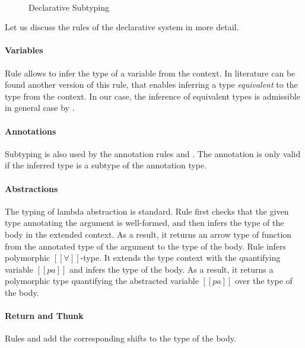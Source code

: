 \begin{figure}[h]

  \begin{multicols}{2}
  \ottdefnDTNInf{}
  \columnbreak\\
  \ottdefnDTPInf{}
  \ottdefnDTSpinInf{}
  \end{multicols}
  \hfill

  \caption{Declarative Subtyping}
  \label{fig:declarative-inference}
\end{figure}

Let us discuss the rules of the declarative system in more detail.

\paragraph{Variables}
  Rule  allows to infer
  the type of a variable from the context. 
  In literature can be found another version of this rule,
  that enables inferring a type \emph{equivalent}
  to the type from the context. 
  In our case, the inference of equivalent types
  is admissible in general case by .

\paragraph{Annotations}
  Subtyping is also used by the annotation rules 
  and . The annotation is only valid if the
  inferred type is a subtype of the annotation type.


\paragraph{Abstractions}
  The typing of lambda abstraction is standard. 
  Rule  first checks
  that the given type annotating the argument is well-formed,
  and then infers the type of the body in the extended context.
  As a result, it returns an arrow type of function from the
  annotated type of the argument to the type of the body.
  Rule  infers polymorphic $[[∀]]$-type. 
  It extends the type context with the quantifying variable $[[pa]]$ and 
  infers the type of the body. As a result, it returns a polymorphic type
  quantifying the abstracted variable $[[pa]]$ over the type of the body.

\paragraph{Return and Thunk}
  Rules  
  and 
  add the corresponding shifts to the type of the body.

